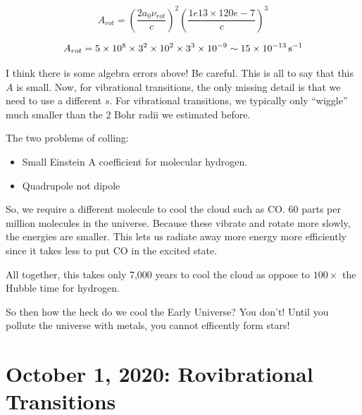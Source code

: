 \documentclass{article}
\newcommand{\unit}[1]{{\,\rm #1}}
\newcommand{\be}{\begin{equation}}
\newcommand{\ee}{\end{equation}}
\newcommand{\s}{\unit{s}}
\begin{document}
\be
A_{rot} = \left(\frac{2a_0 \nu_{rot}}{c}\right) ^2 \left(\frac{1e13 \times 120e-7}{c}\right)^3
\ee

\be
A_{rot} = 5 \times 10^{8} \times 3^2 \times 10^{2} \times 3^3 \times 10^{-9} \sim 15 \times 10^{-13} \s^{-1}
\ee

I think there is some algebra errors above! Be careful. This is all to say that this $A$ is small. Now, for vibrational transitions, the only missing detail is that we need to use a different $s$. For vibrational transitions, we typically only ``wiggle'' much smaller than the 2 Bohr radii we estimated before. 

The two problems of colling:

\begin{itemize}
    \item Small Einstein A coefficient for molecular hydrogen.

    \item Quadrupole not dipole
\end{itemize}

So, we require a different molecule to cool the cloud such as CO. 60 parts per million molecules in the universe. Because these vibrate and rotate more slowly, the energies are smaller. This lets us radiate away more energy more efficiently since it takes less to put CO in the excited state. 

All together, this takes only 7,000 years to cool the cloud as oppose to $100\times$ the Hubble time for hydrogen. 

So then how the heck do we cool the Early Universe? You don't! Until you pollute the universe with metals, you cannot efficently form stars!
























\newpage
\section{October 1, 2020: Rovibrational Transitions}
\end{document}
